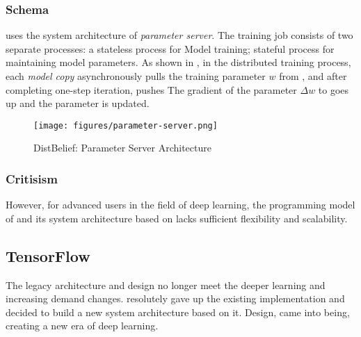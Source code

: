 \begin{content}
\subsubsection{Schema}
 uses the system architecture of \emph{parameter server}. The training job consists of two separate processes: a stateless  process for Model training; stateful  process for maintaining model parameters. As shown in , in the distributed training process, each \emph{model copy} asynchronously pulls the training parameter $w$ from , and after completing one-step iteration, pushes The gradient of the parameter $ \Delta w $ to  goes up and the parameter is updated.
\begin{figure}[H]
  \centering
  \texttt{[image: figures/parameter-server.png]}
  \caption{DistBelief: Parameter Server Architecture}
  \label{fig:parameter-server}
\end{figure}


\subsubsection{Critisism}
However, for advanced users in the field of deep learning, the programming model of  and its system architecture based on  lacks sufficient flexibility and scalability.
\begin{enum}
\end{enum}


\subsection{TensorFlow}
 The legacy architecture and design no longer meet the deeper learning and increasing demand changes.  resolutely gave up the existing  implementation and decided to build a new system architecture based on it. Design,  came into being, creating a new era of deep learning.



\end{content}
